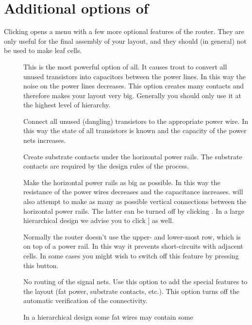 \section{Additional options of \protect{}}
\label{troutopt}
Clicking  opens a menu with a few more optional features
of the router. They are only useful for the final assembly of your layout, and
they should (in general) not be used to make leaf cells.
\begin{description}
\item[]
This is the most powerful option of all. It causes trout to convert all unused
transistors into capacitors between the power lines. In this way the noise
on the power lines decreases. This option creates many contacts and
therefore makes your layout very big. Generally you should only use it at the 
highest level of hierarchy.
\item[]
Connect all unused (dangling) transistors to the appropriate power wire. In
this way the state of all transistors is known and the capacity of the power
nets increases.
\item[]
Create substrate contacts under the horizontal power rails.  The substrate
contacts are required by the design rules of the process.
\item[]
Make the horizontal power rails as big as possible. In this way the resistance
of the power wires decreases and the capacitance increases.
 will also attempt to make as many as possible vertical
connections between the horizontal power rails.  The latter
can be turned off by clicking .  In a
large hierarchical design we advise you to click
] as well.
\item[]
Normally the router doesn't use the upper- and lower-most row, which is on top
of a power rail. In this way it prevents short-circuits with adjacent cells.
In some cases you might wish to switch off this feature by pressing this
button.
\item[]
No routing of the signal nets. Use this option to add the
special features to the layout (fat power, substrate
contacts, etc.).  This option turns off the automatic
verification of the connectivity.
\item[]
In a hierarchical design some fat wires may contain some

\end{description}
